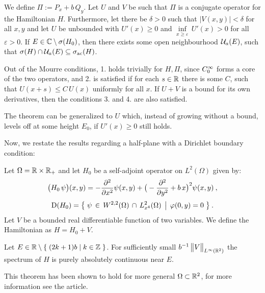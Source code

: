 \begin{thm}
    We define $\mathit\Pi := P_x + b \, Q_y$. Let $U$ and $V$ be such that $\mathit\Pi$ is a conjugate operator for the Hamiltonian $H$. Furthermore, let there be $\delta>0$ such that $|V(x,y)|<\delta$ for all $x,y$ and let $U$ be unbounded with $U'(x) \geq 0$ and $\underset{x\geq\varepsilon}{\inf} \, U'(x) > 0$ for all $\varepsilon>0$. If $E \in \mathbb{C} \setminus \sigma(H_0)$, then there exists some open neighbourhood $\mathcal{U}_a(E)$, such that $\sigma(H) \cap \mathcal{U}_a(E) \subseteq \sigma_{\mathrm{ac}}(H)$.
\end{thm}

\begin{lemma}
    Out of the Mourre conditions, 1. holds trivially for $H, \mathit\Pi$, since $C_0^\infty$ forms a core of the two operators, and 2. is satisfied if for each $s\in\mathbb{R}$ there is some $C$, such that $U(x+s) \leq C \, U(x)$ uniformly for all $x$. If $U+V$ is a bound for its own derivatives, then the conditions 3. and 4. are also satisfied.
\end{lemma}

\begin{lemma}
    The theorem can be generalized to $U$ which, instead of growing without a bound, levels off at some height $E_0$, if $U'(x)\geq 0$ still holds.
\end{lemma}

Now, we restate the results regarding a half-plane with a Dirichlet boundary condition:

\begin{defn}
    Let $\Omega=\mathbb{R}\times\mathbb{R}_+$ and let $H_0$ be a self-adjoint operator on $L^2(\Omega)$ given by:
    \begin{gather*}
        \big( H_0 \, \psi \big)(x, y)
        = -\frac{\partial ^2}{\partial x^2} \psi(x, y)
        + \big( -\frac{\partial ^2}{\partial y^2} + b \, x \big)^2 \psi(x, y)
        \: ,
        \\[3pt]
        \mathrm{D}(H_0)
        = \big\{
            \;
            \psi \,\in\, W^{2,2}(\Omega)
            \,\cap\, L^2_{x^4}(\Omega)
            \;\, \big| \;\,
            \varphi(0, y) = 0
            \;
        \big\}
        \: .
    \end{gather*}
    Let $V$ be a bounded real differentiable function of two variables. We define the Hamiltonian as $H = H_0 + V$.
\end{defn}
\begin{thm}
    Let $E \in \mathbb{R} \setminus \{ \; (2k+1)b \;|\; k \in \mathbb{Z} \;\}$. For sufficiently small $b^{-1} \, \big\lVert V \big\rVert_{L^\infty(\mathbb{R}^2)}$ the spectrum of $H$ is purely absolutely continuous near $E$.
\end{thm}
\noindent This theorem has been shown to hold for more general $\Omega \subset \mathbb{R}^2$, for more information see the article.

